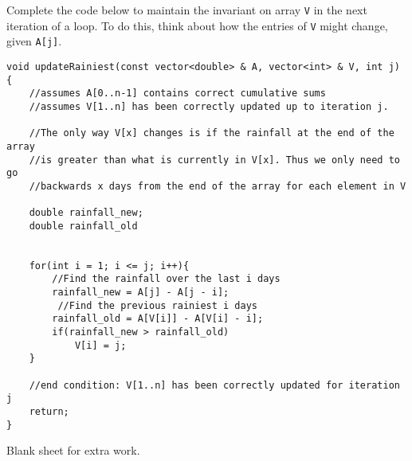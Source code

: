 \documentclass[11pt]{article}
\begin{document}
\begin{enumerate}
\begin{enumerate}
Complete the code below to maintain the invariant on array {\tt V} in the next iteration of a loop. To do this, think about how the entries of {\tt V} might change, given {\tt A[j]}. 

\begin{lstlisting}
void updateRainiest(const vector<double> & A, vector<int> & V, int j) {
    //assumes A[0..n-1] contains correct cumulative sums
    //assumes V[1..n] has been correctly updated up to iteration j.
    
    //The only way V[x] changes is if the rainfall at the end of the array 
    //is greater than what is currently in V[x]. Thus we only need to go
    //backwards x days from the end of the array for each element in V
    
	double rainfall_new;
	double rainfall_old


 	for(int i = 1; i <= j; i++){
		//Find the rainfall over the last i days
		rainfall_new = A[j] - A[j - i]; 
		 //Find the previous rainiest i days
		rainfall_old = A[V[i]] - A[V[i] - i];
		if(rainfall_new > rainfall_old)
			V[i] = j;
	}
    
    //end condition: V[1..n] has been correctly updated for iteration j
    return;
}
\end{lstlisting}


\end{enumerate}

\end{enumerate}

\newpage
Blank sheet for extra work.
\end{document}
